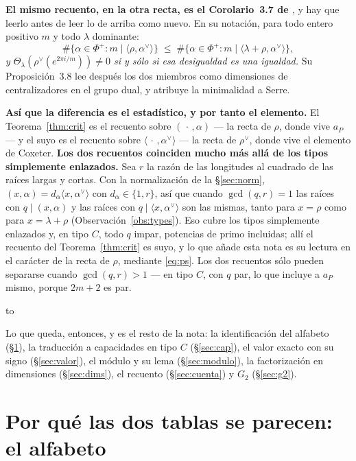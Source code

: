 \documentclass[11pt,a4paper]{article}
\newenvironment{keybox}
  {\par\vspace{9pt}\begin{lrbox}{\fichabox}%
   \begin{minipage}{0.90\textwidth}\vspace{7pt}\setlength{\parskip}{3pt}}
  {\vspace{7pt}\end{minipage}\end{lrbox}%
   \par\noindent\hbox to \textwidth{\hfill
   \textcolor{azul}{\rule[-\dp\fichabox]{3.2pt}{\dimexpr\ht\fichabox+\dp\fichabox\relax}}%
   \colorbox{fondoficha}{\usebox{\fichabox}}\hfill}%
   \par\vspace{9pt}}
\begin{document}
\begin{keybox}
\textbf{El mismo recuento, en la otra recta, es el Corolario~3.7 de \cite{NPP25}}, y hay que leerlo
antes de leer lo de arriba como nuevo. En su notación, para todo entero positivo $m$ y todo
$\lambda$ dominante:
\[
\#\{\alpha\in\Phi^+ : m\mid\langle\rho,\alpha^\vee\rangle\}\;\le\;
\#\{\alpha\in\Phi^+ : m\mid\langle\lambda+\rho,\alpha^\vee\rangle\},
\]
\emph{y $\Theta_\lambda(\rho^\vee(e^{2\pi i/m}))\neq0$ si y sólo si esa desigualdad es una igualdad.}
Su Proposición~3.8 lee después los dos miembros como dimensiones de centralizadores en el grupo
dual, y atribuye la minimalidad a Serre.

\smallskip
\textbf{Así que la diferencia es el estadístico, y por tanto el elemento.} El
Teorema~\ref{thm:crit} es el recuento sobre $(\,\cdot\,,\alpha)$ --- la recta de $\rho$, donde vive
$a_P$ --- y el suyo es el recuento sobre $\langle\,\cdot\,,\alpha^\vee\rangle$ --- la recta de
$\rho^\vee$, donde vive el elemento de Coxeter. \textbf{Los dos recuentos coinciden mucho más allá
de los tipos simplemente enlazados.} Sea $r$ la razón de las longitudes al cuadrado de las raíces
largas y cortas. Con la normalización de la \S\ref{sec:norm},
$(x,\alpha)=d_\alpha\langle x,\alpha^\vee\rangle$ con $d_\alpha\in\{1,r\}$, así que cuando
$\gcd(q,r)=1$ las raíces con $q\mid(x,\alpha)$ y las raíces con $q\mid\langle x,\alpha^\vee\rangle$
son las mismas, tanto para $x=\rho$ como para $x=\lambda+\rho$ (Observación~\ref{obs:types}). Eso
cubre los tipos simplemente enlazados y, en tipo $C$, todo $q$ impar, potencias de primo incluidas;
allí el recuento del Teorema~\ref{thm:crit} es suyo, y lo que añade esta nota es su lectura en el
carácter de la recta de $\rho$, mediante \eqref{eq:ps}. Los dos recuentos sólo pueden separarse
cuando $\gcd(q,r)>1$ --- en tipo $C$, con $q$ par, lo que incluye a $a_P$ mismo, porque $2m+2$ es
par.
\end{keybox}

\noindent Lo que queda, entonces, y es el resto de la nota: la identificación del alfabeto
(\S\ref{sec:alph}), la traducción a capacidades en tipo $C$ (\S\ref{sec:cap}), el valor exacto con su
signo (\S\ref{sec:valor}), el módulo y su lema (\S\ref{sec:modulo}), la factorización en
dimensiones (\S\ref{sec:dims}), el recuento
(\S\ref{sec:cuenta}) y $G_2$ (\S\ref{sec:g2}).

\section{Por qué las dos tablas se parecen: el alfabeto}\label{sec:alph}
\end{document}
